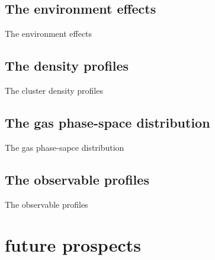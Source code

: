 \documentclass[aspectratio=1610]{beamer}
\begin{document}
\subsection{The environment effects}
\begin{frame}{The environment effects}\label{Wang}
    
\end{frame}

\subsection{The density profiles}
\begin{frame}{The cluster density profiles}\label{Mostoghiu}
    
\end{frame}

\subsection{The gas phase-space distribution}
\begin{frame}{The gas phase-sapce distribution}\label{Arthur}
    
\end{frame}
\subsection{The observable profiles}
\begin{frame}{The observable profiles}\label{Li}
    
\end{frame}
\section{future prospects}
\end{document}

